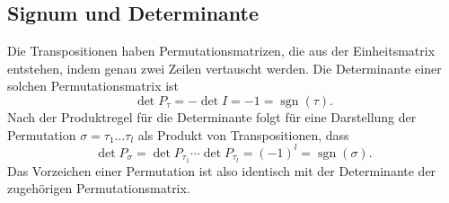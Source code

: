 \subsection{Signum und Determinante}
Die Transpositionen haben Permutationsmatrizen, die aus der Einheitsmatrix
%
%
entstehen, indem genau zwei Zeilen vertauscht werden.
Die Determinante einer solchen Permutationsmatrix ist
\[
\det P_{\tau} = - \det I = -1 = \operatorname{sgn}(\tau).
\]
Nach der Produktregel für die Determinante folgt für eine Darstellung
der Permutation $\sigma=\tau_1\dots\tau_l$ als Produkt von Transpositionen,
dass
\begin{equation}
\det P_{\sigma}
=
\det P_{\tau_1} \cdots \det P_{\tau_l}
=
(-1)^l
=
\operatorname{sgn}(\sigma).
\label{buch:permutationen:determinante}
\end{equation}
Das Vorzeichen einer Permutation ist also identisch mit der Determinante
der zugehörigen Permutationsmatrix.


